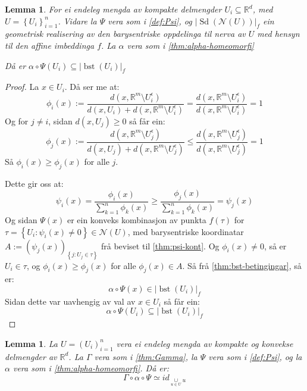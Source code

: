 \documentclass[a4paper, titlepage, 12pt, norsk]{article}
\theoremstyle{plain}
\newtheorem{lemma}[theorem]{Lemma}
\theoremstyle{definition}
\newcommand{\Rb}{\mathbb{R}}
\newcommand{\Nc}{\mathcal{N}}
\newcommand{\union}{ \mathop{\cup}\limits }
\newcommand{\gr}[1]{ \lvert #1 \rvert } %
\newcommand{\set}[1]{ \left \{ #1 \right \} } %
\newcommand{\tuple}[1]{ \left( #1 \right) } %
\DeclareMathOperator{\Sd}{Sd}
\DeclareMathOperator{\bst}{bst}
\begin{document}
\begin{lemma} \label{thm:Psi-inni-bst}
	For ei endeleg mengda av kompakte delmengder \( U_i \subseteq \Rb^d \), med \( U = \set{U_i}_{i=1}^n \). Vidare la \( \Psi \) vera som i \autoref{def:Psi}, og \( \gr{\Sd(\Nc(U))}_f \) ein geometrisk realisering av den barysentriske oppdelinga til nerva av \( U \) med hensyn til den affine imbeddinga \( f \). La \( \alpha \) vera som i \autoref{thm:alpha-homeomorfi}

	Då er \( \alpha \circ \Psi(U_i) \subseteq \gr{\bst(U_i)}_f \)
\end{lemma}

\begin{proof}
	La \( x \in U_i \). Då ser me at:
	\[
		\phi_i(x) := \frac{d(x, \Rb^m \setminus U_i^\epsilon)}{d(x, U_i) + d(x, \Rb^m \setminus U_i^\epsilon)} = \frac{d(x, \Rb^m \setminus U_i^\epsilon)}{d(x, \Rb^m \setminus U_i^\epsilon)} = 1
	\] 
	Og for \( j \neq i \), sidan \( d(x, U_j) \geq 0 \) så får ein:
	\[
		\phi_j(x) := \frac{d(x, \Rb^m \setminus U_j^\epsilon)}{d(x, U_j) + d(x, \Rb^m \setminus U_j^\epsilon)} \leq \frac{d(x, \Rb^m \setminus U_j^\epsilon)}{d(x, \Rb^m \setminus U_j^\epsilon)} = 1
	\]
	Så \( \phi_i(x) \geq \phi_j(x) \) for alle \( j \).

	Dette gir oss at:
	\[
		\psi_i(x) = \frac{\phi_i(x)}{\sum_{k=1}^n \phi_k(x)} \geq \frac{\phi_j(x)}{\sum_{k=1}^n \phi_k(x)} = \psi_j(x)
	\]
	Og sidan \( \Psi(x) \) er ein konveks kombinasjon av punkta \( f(\tau) \) for \( \tau = \set{U_i : \psi_i(x) \neq 0} \in \Nc(U) \), med barysentriske koordinatar \( A:= \tuple{\psi_j(x)}_{\set{ j : U_j\in \tau}} \) frå beviset til \autoref{thm:psi-kont}. Og \( \phi_i(x) \neq 0 \), så er \( U_i \in \tau \), og \( \phi_i(x) \geq \phi_j(x) \) for alle \( \phi_j(x) \in A \). Så frå \autoref{thm:bst-betingingar}, så er:
	\[
		\alpha \circ \Psi(x) \in \gr{\bst(U_i)}_f
	\]
	Sidan dette var uavhengig av val av \( x \in U_i \) så får ein:
	\[
		\alpha \circ \Psi(U_i) \subseteq \gr{\bst(U_i)}_f
	\]
\end{proof}

\begin{lemma}
	La \( U = \tuple{U_i}_{i=1}^n \) vera ei endeleg mengda av kompakte og konvekse delmengder av \( \Rb^d \). La \( \Gamma \) vera som i \autoref{thm:Gamma}, la \( \Psi \) vera som i \autoref{def:Psi}, og la \( \alpha \) vera som i \autoref{thm:alpha-homeomorfi}. Då er:
	\[
		\Gamma \circ \alpha \circ \Psi \simeq id_{\union_{u \in U} u} 
	\]
\end{lemma}
\end{document}
